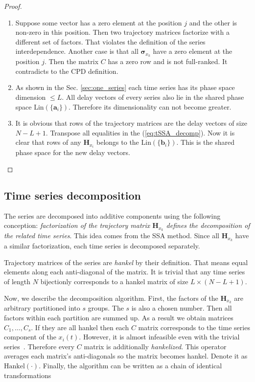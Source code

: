 \documentclass[referee, pdflatex, sn-mathphys-num]{sn-jnl}
\theoremstyle{definition}
\theoremstyle{plain}
\begin{document}
	\begin{proof}
		\begin{enumerate}
			\item Suppose some vector has a zero element at the position $ j $ and the other is non-zero in this position. Then two trajectory matrices factorize with a different set of factors. That violates the definition of the series interdependence. Another case is that all $ \boldsymbol{\sigma}_{x_k} $ have a zero element at the position $ j $. Then the matrix $ C $ has a zero row and is not full-ranked. It contradicts to the CPD definition.
			\item As shown in the Sec. \ref{sec:one_series} each time series has its phase space dimension $ \le L $. All delay vectors of every series also lie in the shared phase space $ \text{Lin}(\{\mathbf{a}_i\}) $. Therefore its dimensionality can not become greater.
			\item It is obvious that rows of the trajectory matrices are the delay vectors of size $ N - L + 1 $. Transpose all equalities in the (\ref{eq:tSSA_decomp}). Now it is clear that rows of any $ \mathbf{H}_{x_i} $ belongs to the $ \text{Lin}(\{\mathbf{b}_i\}) $. This is the shared phase space for the new delay vectors.
		\end{enumerate}
	\end{proof}

	\subsection{Time series decomposition}\label{sec:decomposition}
	
	The series are decomposed into additive components using the following conception: \emph{factorization of the trajectory matrix $ \mathbf{H}_{x_k} $ defines the decomposition of the related time series}. This idea comes from the SSA method. Since all $ \mathbf{H}_{x_k} $ have a similar factorization, each time series is decomposed separately.
	
	Trajectory matrices of the series are \emph{hankel} by their definition. That means equal elements along each anti-diagonal of the matrix. It is trivial that any time series of length $ N $ bijectionly corresponds to a hankel matrix of size $ L \times (N - L + 1) $.
	
	Now, we describe the decomposition algorithm. First, the factors of the $ \mathbf{H}_{x_k} $ are arbitrary partitioned into $ s $ groups. The $ s $ is also a chosen number. Then all factors within each partition are summed up. As a result we obtain matrices $ C_1, \ldots, C_s $. If they are all hankel then each $ C $ matrix corresponds to the time series component of the $ x_i(t) $. However, it is almost infeasible even with the trivial series~\cite{ecfb9dc578be43ae9ee8fc88b8ff9151}. Therefore every $ C $ matrix is additionally \emph{hankelized}. This operator averages each matrix's anti-diagonals so the matrix becomes hankel. Denote it as $ \text{Hankel}(\cdot) $. Finally, the algorithm can be written as a chain of identical transformations
	
\end{document}
